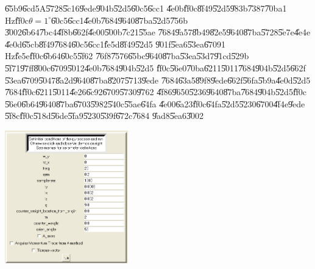 \U{65b9}\U{6cd5}A\U{5728}\U{5c16}\U{9ede}\U{904b}\U{52d5}\U{60c5}\U{6cc1}%
\U{4e0b}\U{ff0c}\U{8f49}\U{52d5}\U{983b}\U{7387}\U{70ba}1 Hz\U{ff0c}$\theta
=1^{\circ }$\U{60c5}\U{6cc1}\U{4e0b}\U{7684}\U{9640}\U{87ba}\U{52d5}\U{756b}%
\U{3002}\U{6b64}\U{7bc4}\U{4f8b}\U{662f}\U{4e00}\U{500b}\U{7c21}\U{55ae}%
\U{7684}\U{9a57}\U{8b49}\U{82e5}\U{9640}\U{87ba}\U{5728}\U{5e7e}\U{4e4e}%
\U{4e0d}\U{65cb}\U{8f49}\U{7684}\U{60c5}\U{6cc1}\U{fe5d}\U{8f49}\U{52d5}%
\U{901f}\U{5ea6}\U{53ea}\U{6709}1 Hz\U{fe5e}\U{ff0c}\U{6b64}\U{60c5}\U{5f62}%
\U{76f8}\U{7576}\U{65bc}\U{9640}\U{87ba}\U{53ea}\U{53d7}\U{91cd}\U{529b}%
\U{5f71}\U{97ff}\U{800c}\U{6709}\U{5012}\U{4e0b}\U{7684}\U{904b}\U{52d5}%
\U{ff0c}\U{56e0}\U{70ba}\U{6211}\U{5011}\U{7684}\U{904b}\U{52d5}\U{662f}%
\U{53ea}\U{6709}\U{5047}\U{8a2d}\U{9640}\U{87ba}\U{8207}\U{5713}\U{9ede}%
\U{7684}\U{63a5}\U{89f8}\U{9ede}\U{662f}\U{56fa}\U{5b9a}\U{4e0d}\U{52d5}%
\U{7684}\U{ff0c}\U{6211}\U{5011}\U{4e26}\U{6c92}\U{6709}\U{5730}\U{9762}%
\U{4f86}\U{9650}\U{5236}\U{9640}\U{87ba}\U{7684}\U{904b}\U{52d5}\U{ff0c}%
\U{56e0}\U{6b64}\U{9640}\U{87ba}\U{6703}\U{5982}\U{540c}\U{55ae}\U{64fa}%
\U{4e00}\U{6a23}\U{ff0c}\U{64fa}\U{52d5}\U{5230}\U{6700}\U{4f4e}\U{9ede}%
\U{5f8c}\U{ff0c}\U{518d}\U{56de}\U{5fa9}\U{5230}\U{539f}\U{672c}\U{7684}%
\U{9ad8}\U{5ea6}\U{3002}

\begin{center}
\includegraphics[width=0.4\textwidth]{./figs/parameter_1.png}
\end{center}%

\clearpage%

